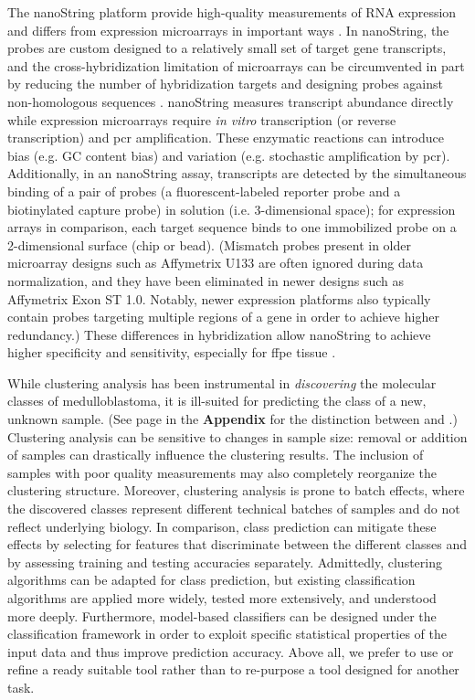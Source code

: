 The nanoString platform provide high-quality measurements of RNA expression and differs from expression microarrays in important ways . In nanoString, the probes are custom designed to a relatively small set of target gene transcripts, and the cross-hybridization limitation of microarrays can be circumvented in part by reducing the number of hybridization targets and designing probes against non-homologous sequences . nanoString measures transcript abundance directly while expression microarrays require \emph{in vitro} transcription (or reverse transcription) and \gls{pcr} amplification. These enzymatic reactions can introduce bias (e.g. GC content bias) and variation (e.g. stochastic amplification by \gls{pcr}). Additionally, in an nanoString assay, transcripts are detected by the simultaneous binding of a pair of probes (a fluorescent-labeled reporter probe and a biotinylated capture probe) in solution (i.e. 3-dimensional space); for expression arrays in comparison, each target sequence binds to one immobilized probe on a 2-dimensional surface (chip or bead). (Mismatch probes present in older microarray designs such as Affymetrix U133 are often ignored during data normalization, and they have been eliminated in newer designs such as Affymetrix Exon ST 1.0. Notably, newer expression platforms also typically contain probes targeting multiple regions of a gene in order to achieve higher redundancy.) These differences in hybridization allow nanoString to achieve higher specificity and sensitivity, especially for \gls{ffpe} tissue .

While clustering analysis has been instrumental in \emph{discovering} the molecular classes of medulloblastoma, it is ill-suited for predicting the class of a new, unknown sample. (See page \pageref{sec:classification} in the \textbf{Appendix} for the distinction between  and .)  Clustering analysis can be sensitive to changes in sample size: removal or addition of samples can drastically influence the clustering results. The inclusion of samples with poor quality measurements may also completely reorganize the clustering structure. Moreover, clustering analysis is prone to batch effects, where the discovered classes represent different technical batches of samples and do not reflect underlying biology. In comparison, class prediction can mitigate these effects by selecting for features that discriminate between the different classes and by assessing training and testing accuracies separately. Admittedly, clustering algorithms can be adapted for class prediction, but existing classification algorithms are applied more widely, tested more extensively, and understood more deeply. Furthermore, model-based classifiers can be designed under the classification framework in order to exploit specific statistical properties of the input data and thus improve prediction accuracy. Above all, we prefer to use or refine a ready suitable tool rather than to re-purpose a tool designed for another task.

